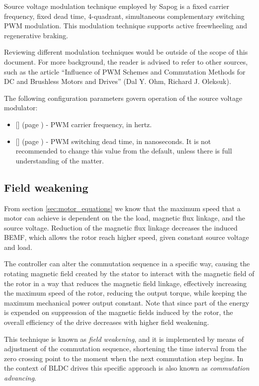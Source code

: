 \documentclass{zubaxdoc}
\newcommand{\CfgRef}[1]{
    \StrSubstitute{#1}{+}{\textunderscore}[\temp]
    \texttt{\temp} {\footnotesize (page \pageref{#1})}
    \listcsxadd{#1}{\thepage}   %
}
\begin{document}
Source voltage modulation technique employed by Sapog is a fixed carrier frequency, fixed dead time,
4-quadrant, simultaneous complementary switching PWM modulation.
This modulation technique supports active freewheeling and regenerative braking.

Reviewing different modulation techniques would be outside of the scope of this document.
For more background, the reader is advised to refer to other sources, such as the article
``Influence of PWM Schemes and Commutation Methods for DC and Brushless Motors and Drives''
(Dal Y. Ohm, Richard J. Oleksuk).

The following configuration parameters govern operation of the source voltage modulator:
\begin{itemize}
\item \CfgRef{mot+pwm+hz} - PWM carrier frequency, in hertz.
\item \CfgRef{mot+pwm+dt+ns} - PWM switching dead time, in nanoseconds.
It is not recommended to change this value from the default,
unless there is full understanding of the matter.
\end{itemize}

\subsection{Field weakening}

From section \ref{sec:motor_equations} we know that the maximum speed that a motor can achieve is dependent
on the the load, magnetic flux linkage, and the source voltage.
Reduction of the magnetic flux linkage decreases the induced BEMF, which allows the rotor reach higher speed,
given constant source voltage and load.

The controller can alter the commutation sequence in a specific way, causing the rotating magnetic field
created by the stator to interact with the magnetic field of the rotor in a way that reduces the magnetic
field linkage, effectively increasing the maximum speed of the rotor, reducing the output torque,
while keeping the maximum mechanical power output constant.
Note that since part of the energy is expended on suppression of the magnetic fields induced by the rotor,
the overall efficiency of the drive decreases with higher field weakening.

This technique is known as \emph{field weakening}, and it is implemented by means of adjustment of the 
commutation sequence, shortening the time interval from the zero crossing point to the moment when the next
commutation step begins.
In the context of BLDC drives this specific approach is also known as \emph{commutation advancing}.
\end{document}
